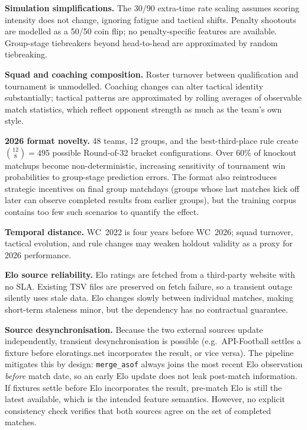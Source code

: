 \documentclass[conference]{IEEEtran}
\begin{document}
\textbf{Simulation simplifications.}
The $30/90$ extra-time rate scaling assumes scoring intensity does not
change, ignoring fatigue and tactical shifts.
Penalty shootouts are modelled as a 50/50 coin flip; no penalty-specific
features are available.
Group-stage tiebreakers beyond head-to-head are approximated by random
tiebreaking.

\textbf{Squad and coaching composition.}
Roster turnover between qualification and tournament is unmodelled.
Coaching changes can alter tactical identity substantially; tactical
patterns are approximated by rolling averages of observable match
statistics, which reflect opponent strength as much as the team's own style.

\textbf{2026 format novelty.}
48 teams, 12 groups, and the best-third-place rule create $\binom{12}{8} =
495$ possible Round-of-32 bracket configurations.
Over 60\% of knockout matchups become non-deterministic, increasing
sensitivity of tournament win probabilities to group-stage prediction
errors.
The format also reintroduces strategic incentives on final group matchdays
(groups whose last matches kick off later can observe completed results
from earlier groups), but the training corpus contains too few such
scenarios to quantify the effect.

\textbf{Temporal distance.}
WC~2022 is four years before WC~2026; squad turnover, tactical evolution,
and rule changes may weaken holdout validity as a proxy for 2026
performance.

\textbf{Elo source reliability.}
Elo ratings are fetched from a third-party website with no SLA\@.
Existing TSV files are preserved on fetch failure, so a transient outage
silently uses stale data.
Elo changes slowly between individual matches, making short-term staleness
minor, but the dependency has no contractual guarantee.

\textbf{Source desynchronisation.}
Because the two external sources update independently, transient
desynchronisation is possible (e.g.\ API-Football settles a fixture before
eloratings.net incorporates the result, or vice versa).
The pipeline mitigates this by design: \texttt{merge\_asof} always joins the
most recent Elo observation \emph{before} match date, so an early Elo update
does not leak post-match information.
If fixtures settle before Elo incorporates the result, pre-match Elo is still
the latest available, which is the intended feature semantics.
However, no explicit consistency check verifies that both sources agree on
the set of completed matches.
\end{document}
